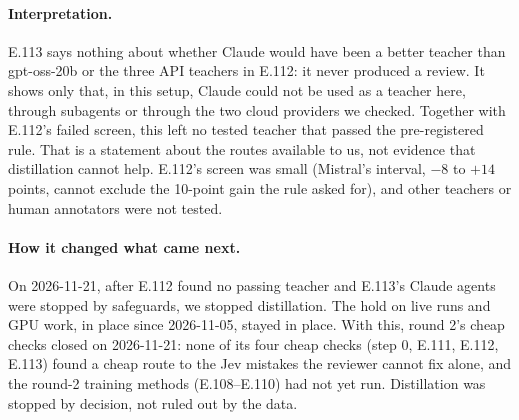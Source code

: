 \documentclass[11pt]{article}
\renewcommand{\_}{\origunderscore\allowbreak}
\begin{document}
\paragraph{Interpretation.}
E.113 says nothing about whether Claude would have been a better teacher than gpt-oss-20b or the three API teachers in E.112: it never produced a review. It shows only that, in this setup, Claude could not be used as a teacher here, through subagents or through the two cloud providers we checked. Together with E.112's failed screen, this left no tested teacher that passed the pre-registered rule. That is a statement about the routes available to us, not evidence that distillation cannot help. E.112's screen was small (Mistral's interval, $-8$ to $+14$ points, cannot exclude the 10-point gain the rule asked for), and other teachers or human annotators were not tested.

\paragraph{How it changed what came next.}
On 2026-11-21, after E.112 found no passing teacher and E.113's Claude agents were stopped by safeguards, we stopped distillation. The hold on live runs and GPU work, in place since 2026-11-05, stayed in place. With this, round 2's cheap checks closed on 2026-11-21: none of its four cheap checks (step 0, E.111, E.112, E.113) found a cheap route to the Jev mistakes the reviewer cannot fix alone, and the round-2 training methods (E.108--E.110) had not yet run. Distillation was stopped by decision, not ruled out by the data.
\end{document}
